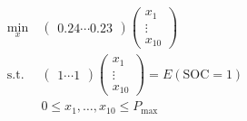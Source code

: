 \documentclass[preview]{standalone}
\begin{document}
\begin{align*}
\begin{aligned}\min_{x} &\  \begin{pmatrix} 0.24 \cdots 0.23 \end{pmatrix} \begin{pmatrix} x_1\\ \vdots\\ x_{10} \end{pmatrix} \\\text{s.t.} &\ \begin{pmatrix} 1 \cdots 1 \end{pmatrix} \begin{pmatrix} x_1\\ \vdots\\ x_{10} \end{pmatrix} = E\left(\text{SOC}=1\right) \\&\ 0 \leq x_1, \ldots , x_{10} \leq P_\text{max} \end{aligned}
\end{align*}
\end{document}
